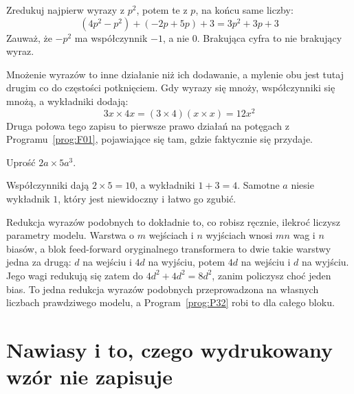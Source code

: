 \begin{fr}
\begin{ansblock}
Zredukuj najpierw wyrazy z $p^{2}$, potem te z $p$, na końcu same liczby:
\[ (4p^{2} - p^{2}) + (-2p + 5p) + 3 = 3p^{2} + 3p + 3 \]
Zauważ, że $-p^{2}$ ma współczynnik $-1$, a nie $0$. Brakująca cyfra to nie
brakujący wyraz.
\end{ansblock}

Mnożenie wyrazów to inne działanie niż ich dodawanie, a mylenie obu jest tutaj
drugim co do częstości potknięciem. Gdy wyrazy się mnoży, współczynniki się
mnożą, a wykładniki dodają:
\[ 3x \times 4x = (3 \times 4)(x \times x) = 12x^{2} \]
Druga połowa tego zapisu to pierwsze prawo działań na potęgach z
Programu~\ref{prog:F01}, pojawiające się tam, gdzie faktycznie się przydaje.

Uprość $2a \times 5a^{3}$.
\nextframe
\end{fr}

\begin{fr}
Współczynniki dają $2 \times 5 = 10$, a wykładniki $1 + 3 = 4$. Samotne $a$
niesie wykładnik $1$, który jest niewidoczny i łatwo go zgubić.

\begin{aibox}
Redukcja wyrazów podobnych to dokładnie to, co robisz ręcznie, ilekroć liczysz
parametry modelu. Warstwa o $m$ wejściach i $n$ wyjściach wnosi $mn$ wag i $n$
biasów, a blok feed-forward oryginalnego transformera to dwie takie warstwy
jedna za drugą: $d$ na wejściu i $4d$ na wyjściu, potem $4d$ na wejściu i $d$
na wyjściu. Jego wagi redukują się zatem do $4d^{2} + 4d^{2} = 8d^{2}$, zanim
policzysz choć jeden bias. To jedna redukcja wyrazów podobnych przeprowadzona
na własnych liczbach prawdziwego modelu, a Program~\ref{prog:P32} robi to dla
całego bloku.
\end{aibox}
\end{fr}

\section{Nawiasy i to, czego wydrukowany wzór nie zapisuje}
\label{sec:F02-precedence}

